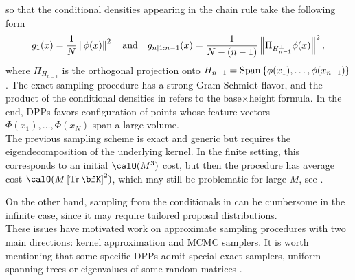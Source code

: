 \documentclass[twoside,11pt]{article}
\begin{document}
      so that the conditional densities appearing in the chain rule take the following form
      \begin{equation}
      \label{eq:conditionals_densities}
        g_1(x)
          = \frac{1}{N} \left\| \phi(x) \right\|^2
          \quad\text{and}\quad
        g_{n | 1:n-1}(x)
          = \frac{1}{N-(n-1)} \left\|  \Pi_{H_{n-1}^{\perp}} \phi(x) \right\|^2,
      \end{equation}
      where $\Pi_{H_{n-1}}$ is the orthogonal projection onto
      $H_{n-1} = \operatorname{Span}\left\{ \phi(x_1), \dots, \phi(x_{n-1})  \right\}$.
      The exact sampling procedure has a strong Gram-Schmidt flavor, and the product of the conditional densities in  refers to the base$\times$height formula.
      In the end, DPPs favors configuration of points whose feature vectors $\Phi(x_1),\dots, \Phi(x_N)$ span a large volume.\\

      The previous sampling scheme is exact and generic but requires the eigendecomposition of the underlying kernel.
      In the finite setting, this corresponds to an initial $\calO(M^3)$ cost, but then the procedure has average cost $\calO(M\lrb{\Tr \bfK}^2)$, which may still be problematic for large $M$, see \citep{TrBaAm18}.

      On the other hand, sampling from the conditionals in  can be cumbersome in the infinite case, since it may require tailored proposal distributions.\\

      These issues have motivated work on approximate sampling procedures with two main directions: kernel approximation and MCMC samplers.
      It is worth mentioning that some specific DPPs admit special exact samplers, \eg uniform spanning trees \citep{PrWi98} or eigenvalues of some random matrices \citep{DuEd02}.

\end{document}
